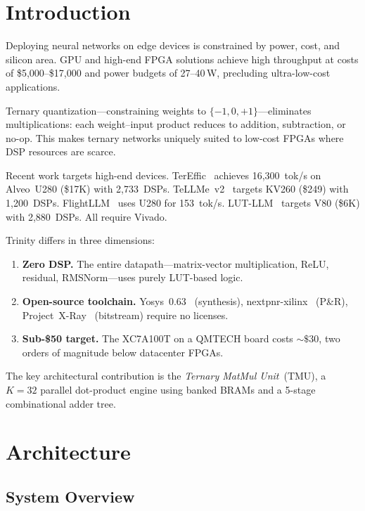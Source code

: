 \documentclass[conference]{IEEEtran}
\begin{document}
\section{Introduction}

Deploying neural networks on edge devices is constrained by power, cost, and
silicon area.  GPU and high-end FPGA solutions achieve high throughput at
costs of \$5,000--\$17,000 and power budgets of 27--40\,W, precluding
ultra-low-cost applications.

Ternary quantization---constraining weights to $\{-1, 0, +1\}$---eliminates
multiplications: each weight--input product reduces to addition, subtraction,
or no-op.  This makes ternary networks uniquely suited to low-cost FPGAs
where DSP resources are scarce.

Recent work targets high-end devices.  TerEffic~\cite{tereffic} achieves
16,300~tok/s on Alveo~U280 (\$17K) with 2,733~DSPs.  TeLLMe~v2~\cite{tellme}
targets KV260 (\$249) with 1,200~DSPs.  FlightLLM~\cite{flightllm} uses U280
for 153~tok/s.  LUT-LLM~\cite{lutllm} targets V80 (\$6K) with 2,880~DSPs.
All require Vivado.

Trinity differs in three dimensions:
\begin{enumerate}
  \item \textbf{Zero DSP.}  The entire datapath---matrix-vector multiplication,
    ReLU, residual, RMSNorm---uses purely LUT-based logic.
  \item \textbf{Open-source toolchain.}  Yosys~0.63~\cite{yosys} (synthesis),
    nextpnr-xilinx~\cite{nextpnr} (P\&R), Project~X-Ray~\cite{prjxray}
    (bitstream) require no licenses.
  \item \textbf{Sub-\$50 target.}  The XC7A100T on a QMTECH board costs
    ${\sim}\$30$, two orders of magnitude below datacenter FPGAs.
\end{enumerate}

The key architectural contribution is the \textit{Ternary MatMul Unit}~(TMU),
a $K\!=\!32$ parallel dot-product engine using banked BRAMs and a 5-stage
combinational adder tree.

\section{Architecture}

\subsection{System Overview}
\end{document}
